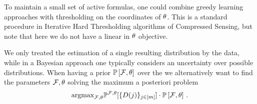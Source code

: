 \begin{remark}
    To maintain a small set of active formulas, one could combine greedy learning approaches with thresholding on the coordinates of $\theta$.
    This is a standard procedure in Iterative Hard Thresholding algorithms of Compressed Sensing, but note that here we do not have a linear in $\theta$ objective.
\end{remark}










\begin{remark}
    We only treated the estimation of a single resulting distribution by the data, while in a Bayesian approach one typically considers an uncertainty over possible distributions.
    When having a prior $\mathbb{P}\left[\mathcal{F},\theta\right]$ over the \MarkovLogicNetworks{} we alternatively want to find the parameters $\mathcal{F},\theta$ solving the maximum a posteriori problem
    \begin{align}
        \mathrm{argmax}_{\mathcal{F},\theta} \mathbb{P}^{\mathcal{F},\theta}[\{D(j)\}_{j\in[m]}]\cdot \mathbb{P}\left[\mathcal{F},\theta\right]\, .
    \end{align}
\end{remark}



